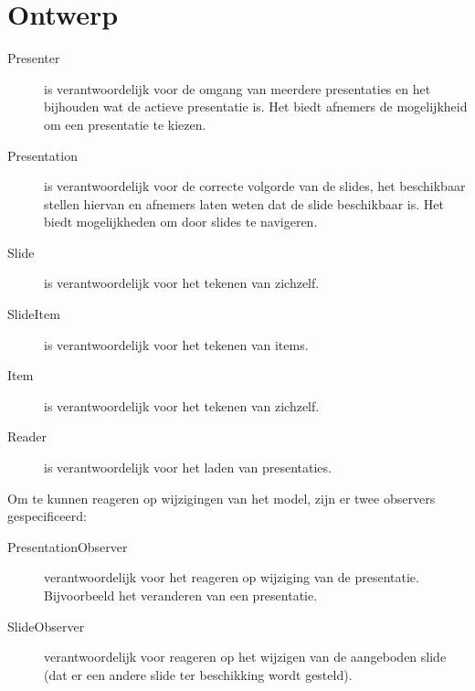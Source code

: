 \documentclass[a4paper]{article}
\begin{document}
\section{Ontwerp}
\begin{description}
\item[Presenter] is verantwoordelijk voor de omgang van meerdere presentaties en het bijhouden wat de actieve presentatie is. Het biedt afnemers de mogelijkheid om een presentatie te kiezen.
\item[Presentation] is verantwoordelijk voor de correcte volgorde van de slides, het beschikbaar stellen hiervan en afnemers laten weten dat de slide beschikbaar is. Het biedt mogelijkheden om door slides te navigeren.
\item[Slide] is verantwoordelijk voor het tekenen van zichzelf.
\item[SlideItem] is verantwoordelijk voor het tekenen van items.
\item[Item] is verantwoordelijk voor het tekenen van zichzelf.
\item[Reader] is verantwoordelijk voor het laden van presentaties.
\end{description}
Om te kunnen reageren op wijzigingen van het model, zijn er twee observers gespecificeerd:
\begin{description}
\item[PresentationObserver] verantwoordelijk voor het reageren op wijziging van de presentatie. Bijvoorbeeld het veranderen van een presentatie.
\item[SlideObserver] verantwoordelijk voor reageren op het wijzigen van de aangeboden slide (dat er een andere slide ter beschikking wordt gesteld).
\end{description}
\end{document}
